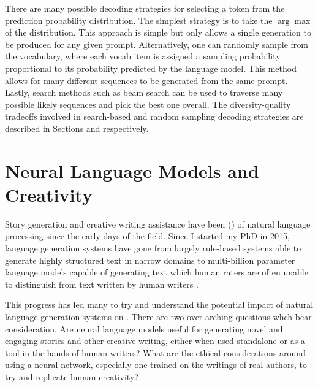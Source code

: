 There are many possible decoding strategies for selecting a token from the prediction probability distribution.
The simplest strategy is to take the $\arg \max$ of the distribution.
This approach is simple but only allows a single generation to be produced for any given prompt.
Alternatively, one can randomly sample from the vocabulary, where each vocab item is assigned a sampling probability proportional to its probability predicted by the language model.
This method allows for many different sequences to be generated from the same prompt.
Lastly, search methods such as beam search can be used to traverse many possible likely sequences and pick the best one overall.
The diversity-quality tradeoffs involved in search-based and random sampling decoding strategies are described in Sections \TODO{} and \TODO{} respectively.

\section{Neural Language Models and Creativity}

Story generation and creative writing assistance have been \TODO() of natural language processing since the early days of the field.
Since I started my PhD in 2015, language generation systems have gone from largely rule-based systems able to generate highly structured text in narrow domains  to multi-billion parameter language models capable of generating text which human raters are often unable to distinguish from text written by human writers .

This progress has led many to try and understand the potential impact of natural language generation systems on \TODO{}.
There are two over-arching questions whch bear consideration.
Are neural language models useful for generating novel and engaging stories and other creative writing, either when used standalone or as a tool in the hands of human writers?
What are the ethical considerations around using a neural network, especially one trained on the writings of real authors, to try and replicate human creativity?